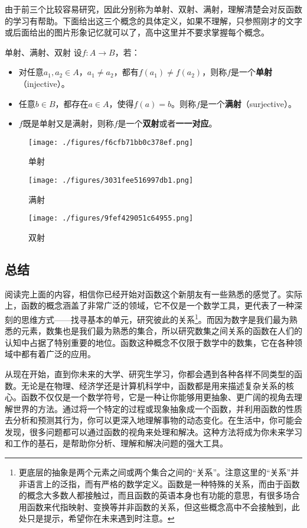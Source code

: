 由于前三个比较容易研究，因此分别称为单射、双射、满射，理解清楚会对反函数的学习有帮助。下面给出这三个概念的具体定义，如果不理解，只参照刚才的文字或后面给出的图片形象记忆就可以了，高中这里并不要求掌握每个概念。

\begin{definition}{单射、满射、双射}
设$f:A\to{B}$，若：
\begin{itemize}
\item 对任意$a_1,a_2\in{A}$，$a_1\not={a_2}$，都有$f(a_1)\not={f(a_2)}$，则称$f$是一个\textbf{单射}（injective）。
\item 任意$b\in{B}$，都存在$a\in{A}$，使得$f(a)=b$。则称$f$是一个\textbf{满射}（surjective）。
\item $f$既是单射又是满射，则称$f$是一个\textbf{双射}或者\textbf{一一对应}。
\end{itemize}
\end{definition}

\begin{figure}[ht]
\centering
\texttt{[image: ./figures/f6cfb71bb0c378ef.png]}
\caption{单射}\label{fig_functi_2}
\end{figure}
\begin{figure}[ht]
\centering
\texttt{[image: ./figures/3031fee516997db1.png]}
\caption{满射} \label{fig_functi_3}
\end{figure}
\begin{figure}[ht]
\centering
\texttt{[image: ./figures/9fef429051c64955.png]}
\caption{双射} \label{fig_functi_4}
\end{figure}
\subsection{总结}

阅读完上面的内容，相信你已经开始对函数这个新朋友有一些熟悉的感觉了。实际上，函数的概念涵盖了非常广泛的领域，它不仅是一个数学工具，更代表了一种深刻的思维方式——找寻基本的单元，研究彼此的关系\footnote{更底层的抽象是两个元素之间或两个集合之间的“关系”。注意这里的“关系”并非语言上的泛指，而有严格的数学定义。函数是一种特殊的关系，而由于函数的概念大多数人都接触过，而且函数的英语本身也有功能的意思，有很多场合用函数来代指映射、变换等并非函数的关系，但这些概念高中不会接触到，此处只是提示，希望你在未来遇到时注意。}。而因为数字是我们最为熟悉的元素，数集也是我们最为熟悉的集合，所以研究数集之间关系的函数在人们的认知中占据了特别重要的地位。函数这种概念不仅限于数学中的数集，它在各种领域中都有着广泛的应用。

从现在开始，直到你未来的大学、研究生学习，你都会遇到各种各样不同类型的函数。无论是在物理、经济学还是计算机科学中，函数都是用来描述复杂关系的核心。函数不仅仅是一个数学符号，它是一种让你能够用更抽象、更广阔的视角去理解世界的方法。通过将一个特定的过程或现象抽象成一个函数，并利用函数的性质去分析和预测其行为，你可以更深入地理解事物的动态变化。在生活中，你可能会发现，很多问题都可以通过函数的视角来处理和解决。这种方法将成为你未来学习和工作的基石，是帮助你分析、理解和解决问题的强大工具。
